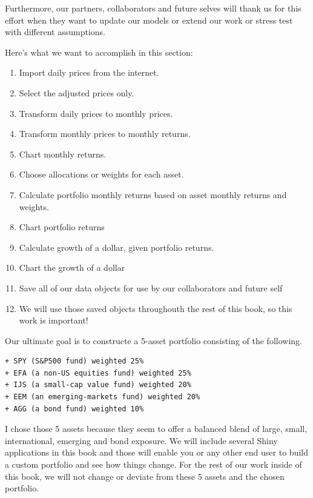 \documentclass[]{krantz}
\providecommand{\tightlist}{%
  \setlength{\itemsep}{0pt}\setlength{\parskip}{0pt}}
\begin{document}
Furthermore, our partners, collaborators and future selves will thank us
for this effort when they want to update our models or extend our work
or stress test with different assumptions.

Here's what we want to accomplish in this section:

\begin{enumerate}
\def\labelenumi{\arabic{enumi})}
\tightlist
\item
  Import daily prices from the internet.
\item
  Select the adjusted prices only.
\item
  Transform daily prices to monthly prices.
\item
  Transform monthly prices to monthly returns.
\item
  Chart monthly returns.
\item
  Choose allocations or weights for each asset.
\item
  Calculate portfolio monthly returns based on asset monthly returns and
  weights.
\item
  Chart portfolio returns
\item
  Calculate growth of a dollar, given portfolio returns.
\item
  Chart the growth of a dollar
\item
  Save all of our data objects for use by our collaborators and future
  self
\item
  We will use those saved objects throughouth the rest of this book, so
  this work is important!
\end{enumerate}

Our ultimate goal is to constructe a 5-asset portfolio consisting of the
following.

\begin{verbatim}
+ SPY (S&P500 fund) weighted 25%
+ EFA (a non-US equities fund) weighted 25%
+ IJS (a small-cap value fund) weighted 20%
+ EEM (an emerging-markets fund) weighted 20%
+ AGG (a bond fund) weighted 10%
\end{verbatim}

I chose those 5 assets because they seem to offer a balanced blend of
large, small, international, emerging and bond exposure. We will include
several Shiny applications in this book and those will enable you or any
other end user to build a custom portfolio and see how things change.
For the rest of our work inside of this book, we will not change or
deviate from these 5 assets and the chosen portfolio.
\end{document}
